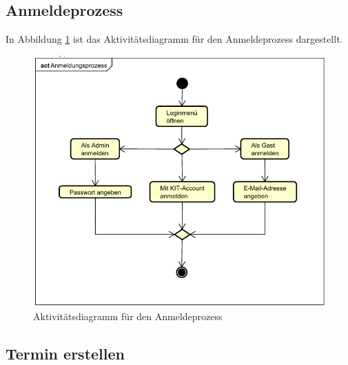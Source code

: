 \subsection{Anmeldeprozess}

In Abbildung \ref{fig:activity_diagram_login} ist das Aktivitätsdiagramm für den Anmeldeprozess dargestellt.
\begin{figure}[ht]
    \centering
    \includegraphics[scale=0.15]{figures/activitydiagrams/anmeldeprozess}
    \caption{Aktivitätsdiagramm für den Anmeldeprozess}
    \label{fig:activity_diagram_login}
\end{figure}
\clearpage
\subsection{Termin erstellen}

